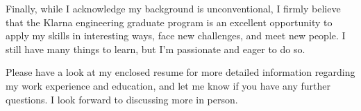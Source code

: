 \documentclass[11pt,a4paper,sans]{moderncv}        %
\begin{document}
Finally, while I acknowledge my background is unconventional, I firmly
believe that the Klarna engineering graduate program is an excellent
opportunity to apply my skills in interesting ways, face new
challenges, and meet new people. I still have many things to learn,
but I’m passionate and eager to do so.

Please have a look at my enclosed resume for more detailed information
regarding my work experience and education, and let me know if you
have any further questions. I look forward to discussing more in
person.

\makeletterclosing
\end{document}
